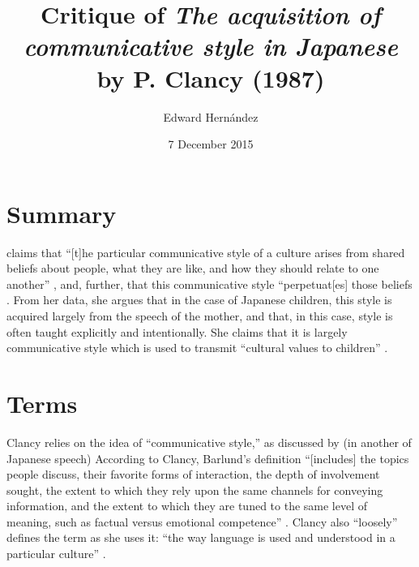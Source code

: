 \documentclass[man,12pt,natbib]{apa6}
\begin{document}
\title{Critique of \emph{The acquisition of communicative style in Japanese} by
	P. Clancy (1987)}
\author{Edward Hern\'{a}ndez}
\date{7 December 2015}
\maketitle


\section{Summary}

\citet{Clancy87} claims that ``[t]he particular communicative style of a
culture arises from shared beliefs about people, what they are like, and how
they should relate to one another'' \cite[p.~245]{Clancy87}, and, further, that
this communicative style ``perpetuat[es] those beliefs \cite[p.~245]{Clancy87}.
From her data, she argues that in the case of Japanese children, this style is
acquired largely from the speech of the mother, and that, in this case, style
is often taught explicitly and intentionally.  She claims that it is largely
communicative style which is used to transmit ``cultural values to children''
\cite[p.~246]{Clancy87}.

\section{Terms}

Clancy relies on the idea of ``communicative style,'' as discussed by
\citet{Barlund75} (in another of Japanese speech) According to Clancy,
Barlund's definition ``[includes] the topics people discuss, their favorite
forms of interaction, the depth of involvement sought, the extent to which they
rely upon the same channels for conveying information, and the extent to which
they are tuned to the same level of meaning, such as factual versus emotional
competence'' \citep[p.~213]{Clancy87}.
Clancy also ``loosely'' defines the term as she uses it: ``the way language is
used and understood in a particular culture'' \citep[p.~213]{Clancy87}.
\end{document}
